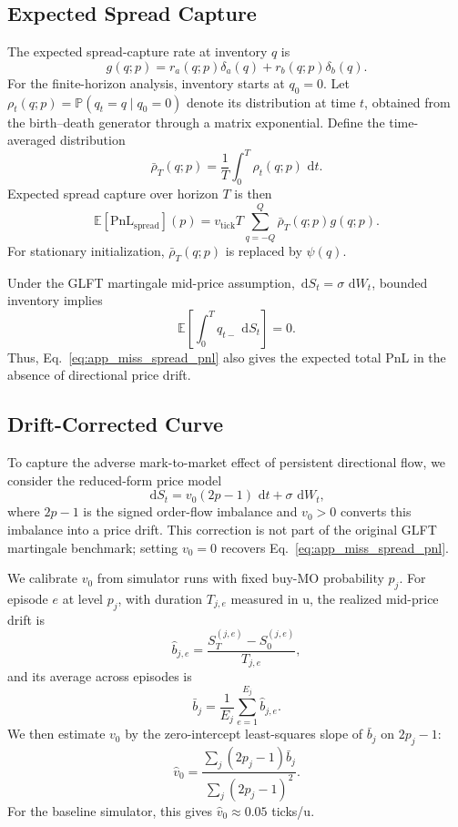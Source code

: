 \documentclass[11pt,a4paper]{article}
\newcommand{\E}{\mathbb{E}}
\newcommand{\Prob}{\mathbb{P}}
\newcommand{\dd}{\,\mathrm{d}}
\begin{document}
\subsection{Expected Spread Capture}

The expected spread-capture rate at inventory $q$ is
\[
  g(q;p)
  =
  r_a(q;p)\delta_a(q)+r_b(q;p)\delta_b(q).
\]
For the finite-horizon analysis, inventory starts at
$q_0=0$. Let
$\rho_t(q;p)=\Prob(q_t=q\mid q_0=0)$ denote its
distribution at time $t$, obtained from the
birth--death generator through a matrix exponential.
Define the time-averaged distribution
\[
  \bar\rho_T(q;p)
  =
  \frac{1}{T}\int_0^T\rho_t(q;p)\,\dd t.
\]
Expected spread capture over horizon $T$ is then
\begin{equation}
  \E[\mathrm{PnL}_{\mathrm{spread}}](p)
  =
  v_{\mathrm{tick}}T
  \sum_{q=-Q}^{Q}\bar\rho_T(q;p)g(q;p).
  \label{eq:app_miss_spread_pnl}
\end{equation}
For stationary initialization, $\bar\rho_T(q;p)$
is replaced by $\psi(q)$.

Under the GLFT martingale mid-price assumption,
$\dd S_t=\sigma\,\dd W_t$, bounded inventory implies
\[
  \E\left[\int_0^T q_{t-}\,\dd S_t\right]=0.
\]
Thus, Eq.~\eqref{eq:app_miss_spread_pnl} also gives
the expected total PnL in the absence of
directional price drift.
  \subsection{Drift-Corrected Curve}

To capture the adverse mark-to-market effect of persistent
directional flow, we consider the reduced-form price model
\[
  \dd S_t
  =
  v_0(2p-1)\,\dd t+\sigma\,\dd W_t,
\]
where $2p-1$ is the signed order-flow imbalance and
$v_0>0$ converts this imbalance into a price drift.
This correction is not part of the original GLFT
martingale benchmark; setting $v_0=0$ recovers
Eq.~\eqref{eq:app_miss_spread_pnl}.

We calibrate $v_0$ from simulator runs with fixed
buy-MO probability $p_j$. For episode $e$ at level $p_j$,
with duration $T_{j,e}$ measured in $\mathrm{u}$,
the realized mid-price drift is
\[
  \widehat b_{j,e}
  =
  \frac{S_T^{(j,e)}-S_0^{(j,e)}}{T_{j,e}},
\]
and its average across episodes is
\[
  \bar b_j
  =
  \frac{1}{E_j}\sum_{e=1}^{E_j}\widehat b_{j,e}.
\]
We then estimate $v_0$ by the zero-intercept
least-squares slope of $\bar b_j$ on $2p_j-1$:
\[
  \widehat v_0
  =
  \frac{\sum_j (2p_j-1)\bar b_j}
       {\sum_j (2p_j-1)^2}.
\]
For the baseline simulator, this gives
$\widehat v_0\approx 0.05$ ticks/$\mathrm{u}$.
\end{document}
